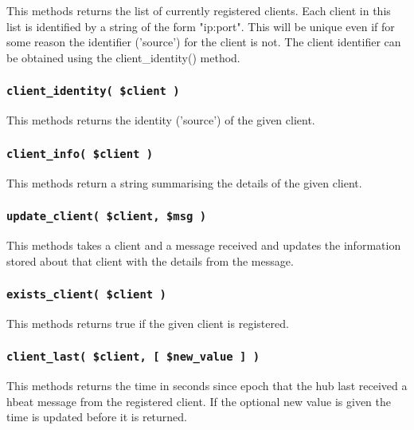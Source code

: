 \documentclass[12pt,a4paper]{article}
\begin{document}
This methods returns the list of currently registered clients.  Each
client in this list is identified by a string of the form "ip:port".
This will be unique even if for some reason the identifier ('source')
for the client is not.  The client identifier can be obtained using
the \textsf{client\_identity()} method.

\subsubsection*{\texttt{client\_identity( \$client )}\label{xPL::Hub_client_identity_client_}}


This methods returns the identity ('source') of the given client.

\subsubsection*{\texttt{client\_info( \$client )}\label{xPL::Hub_client_info_client_}}


This methods return a string summarising the details of the given
client.

\subsubsection*{\texttt{update\_client( \$client, \$msg )}\label{xPL::Hub_update_client_client_msg_}}


This methods takes a client and a message received and updates the information
stored about that client with the details from the message.

\subsubsection*{\texttt{exists\_client( \$client )}\label{xPL::Hub_exists_client_client_}}


This methods returns true if the given client is registered.

\subsubsection*{\texttt{client\_last( \$client, [ \$new\_value ] )}\label{xPL::Hub_client_last_client_new_value_}}


This methods returns the time in seconds since epoch that the hub last
received a hbeat message from the registered client.  If the optional
new value is given the time is updated before it is returned.
\end{document}
